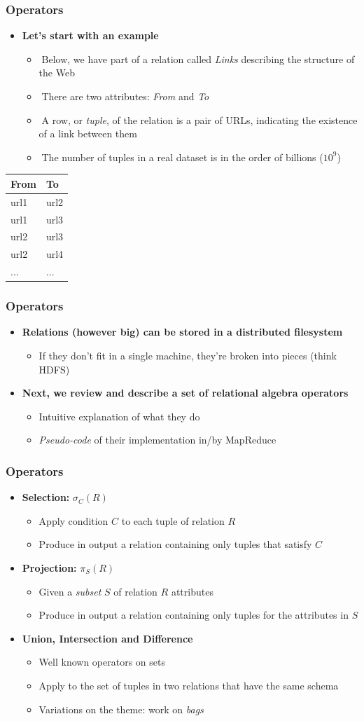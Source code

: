 \documentclass{beamer}
\newcommand{\bi}{\begin{itemize}}
\newcommand{\ei}{\end{itemize}}
\newcommand{\ii}{\item}
\newcommand*{\myblue}[1]{\textcolor{myblue}{#1}}
\newcommand{\select}{\sigma}
\newcommand{\project}{\pi}
\begin{document}
\begin{frame}
\frametitle{Operators}
\bi
\ii \textbf{Let’s start with an example}
\bi
\ii 􏰀Below, we have part of a relation called \textit{Links} describing the structure of the Web
􏰀\ii 􏰀There are two attributes: \textit{From} and \textit{To}
\ii 􏰀A row, or \myblue{\textit{tuple}}, of the relation is a pair of URLs, indicating the existence of a link between them
\ii 􏰀The number of tuples in a real dataset is in the order of billions ($10^9$)
\ei
\ei

\begin{table}[h]
\centering
\begin{tabular}{l l}
\toprule
\textbf{From} & \textbf{To}\\
\midrule
url1 & url2 \\
url1 & url3 \\
url2 & url3 \\
url2 & url4 \\
... & ...
\end{tabular}
\end{table}

\end{frame}


\begin{frame}
\frametitle{Operators}
\bi
\ii \textbf{Relations (however big) can be stored in a distributed filesystem}
\bi
\ii If they don't fit in a single machine, they're broken into pieces (think HDFS)
\ei
\ei
\bi
\ii \textbf{Next, we review and describe a set of relational algebra operators}
\bi
\ii Intuitive explanation of what they do
\ii \textit{Pseudo-code} of their implementation in/by MapReduce
\ei
\ei
\end{frame}



\begin{frame}
\frametitle{Operators}
\bi
\ii \textbf{Selection:} $\select_{C}(R)$
\bi
\ii Apply condition $C$ to each tuple of relation $R$
\ii Produce in output a relation containing only tuples that satisfy $C$
\ei
\ei
\bi
\ii \textbf{Projection:} $\project_{S}(R)$
\bi
\ii Given a \textit{subset} $S$ of relation $R$ attributes
\ii Produce in output a relation containing only tuples for the attributes in $S$
\ei
\ei
\bi
\ii \textbf{Union, Intersection and Difference} 
\bi
\ii Well known operators on sets
\ii Apply to the set of tuples in two relations that have the \myblue{same schema}
\ii Variations on the theme: work on \textit{bags}
\ei

\ei
\end{frame}
\end{document}
